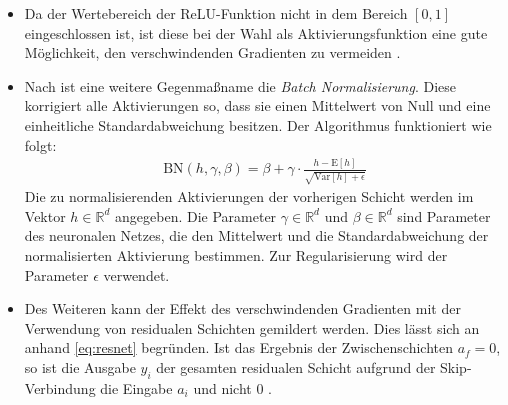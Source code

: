 \documentclass[12pt,a4paper,bibliography=totocnumbered,listof=totocnumbered]{article}
\begin{document}
\begin{itemize}
\item Da der Wertebereich der ReLU-Funktion nicht in dem Bereich $[0,1]$ eingeschlossen ist, ist diese bei der Wahl als Aktivierungsfunktion eine gute Möglichkeit, den verschwindenden Gradienten zu vermeiden \citep[S. 136]{Kubat.2021}.

\item Nach \citep{Cooijmans.30.03.2016} ist eine weitere Gegenmaßname die \emph{Batch Normalisierung}. Diese korrigiert alle Aktivierungen so, dass sie einen Mittelwert von Null und eine einheitliche Standardabweichung besitzen. Der Algorithmus funktioniert wie folgt:
\begin{align}
\text{BN}(h, \gamma, \beta) = \beta + \gamma \cdot \frac{h - \text{E}[h]}{\sqrt{\text{Var}[h] + \epsilon}}
\end{align}
Die zu normalisierenden Aktivierungen der vorherigen Schicht werden im Vektor $h \in \mathbb{R}^d$ angegeben. Die Parameter $\gamma \in \mathbb{R}^d$ und $\beta \in \mathbb{R}^d$ sind Parameter des neuronalen Netzes, die den Mittelwert und die Standardabweichung der normalisierten Aktivierung bestimmen. Zur Regularisierung wird der Parameter $\epsilon$ verwendet.\\
\item Des Weiteren kann der Effekt des verschwindenden Gradienten mit der Verwendung von residualen Schichten gemildert werden. Dies lässt sich an anhand \autoref{eq:resnet} begründen. Ist das Ergebnis der Zwischenschichten $a_f=0$, so ist die Ausgabe $y_i$ der gesamten residualen Schicht aufgrund der Skip-Verbindung die Eingabe $a_i$ und nicht 0 \citep[S.221 ff.]{Krohn.2020}.
\end{itemize}
\end{document}
